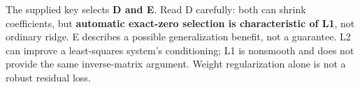 The supplied key selects \textbf{D and E}. Read D carefully: both can shrink coefficients, but \textbf{automatic exact-zero selection is characteristic of L1}, not ordinary ridge. E describes a possible generalization benefit, not a guarantee. L2 can improve a least-squares system's conditioning; L1 is nonsmooth and does not provide the same inverse-matrix argument. Weight regularization alone is not a robust residual loss.
